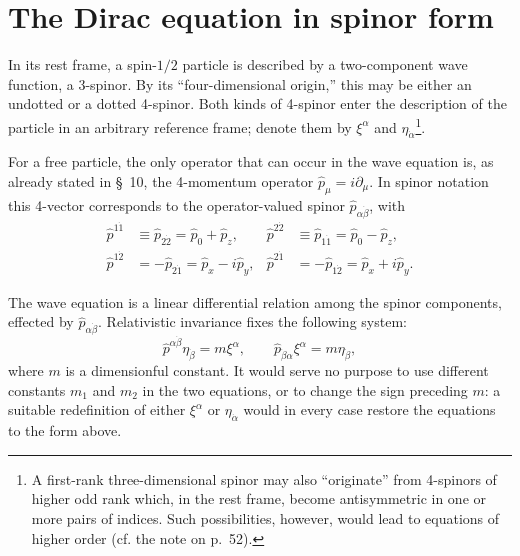 
\section{The Dirac equation in spinor form}

In its rest frame, a spin-$1/2$ particle is described by a two-component wave function, a 3-spinor. By its ``four-dimensional origin,'' this may be either an undotted or a dotted 4-spinor. Both kinds of 4-spinor enter the description of the particle in an arbitrary reference frame; denote them by $\xi^\alpha$ and $\eta_{\dot\alpha}$\footnote{A first-rank three-dimensional spinor may also ``originate'' from 4-spinors of higher odd rank which, in the rest frame, become antisymmetric in one or more pairs of indices. Such possibilities, however, would lead to equations of higher order (cf. the note on p.~52).}.

For a free particle, the only operator that can occur in the wave equation is, as already stated in \S~10, the 4-momentum operator $\widehat p_\mu=i\partial_\mu$. In spinor notation this 4-vector corresponds to the operator-valued spinor $\widehat p_{\alpha\dot\beta}$, with
\begin{equation}
\begin{aligned}
\widehat p^{1\dot1}&\equiv\widehat p_{2\dot2}=\widehat p_0+\widehat p_z,
&\widehat p^{2\dot2}&\equiv\widehat p_{1\dot1}=\widehat p_0-\widehat p_z,\\
\widehat p^{1\dot2}&=-\widehat p_{2\dot1}=\widehat p_x-i\widehat p_y,
&\widehat p^{2\dot1}&=-\widehat p_{1\dot2}=\widehat p_x+i\widehat p_y.
\end{aligned}
\tag{20.1}
\end{equation}

The wave equation is a linear differential relation among the spinor components, effected by $\widehat p_{\alpha\dot\beta}$. Relativistic invariance fixes the following system:
\begin{equation}
\widehat p^{\alpha\dot\beta}\eta_{\dot\beta}=m\xi^\alpha,
\qquad
\widehat p_{\dot\beta\alpha}\xi^\alpha=m\eta_{\dot\beta},
\tag{20.2}
\end{equation}
where $m$ is a dimensionful constant. It would serve no purpose to use different constants $m_1$ and $m_2$ in the two equations, or to change the sign preceding $m$: a suitable redefinition of either $\xi^\alpha$ or $\eta_{\dot\alpha}$ would in every case restore the equations to the form above.


